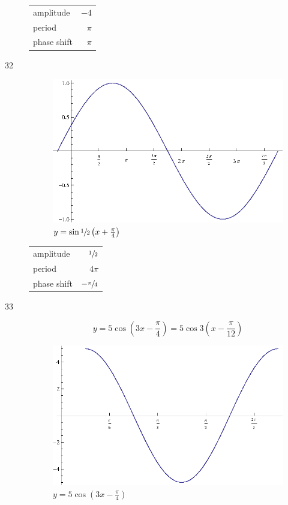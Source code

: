 \documentclass{exam}
\begin{document}
\begin{description}
        \begin{tabular}[H]{lr}
          \toprule
          amplitude   & $-4$ \\
          period      & $\pi$ \\
          phase shift & $\pi$ \\
          \bottomrule
        \end{tabular}

      \item[32]
        \begin{figure}[H]
          \centering
          \includegraphics[scale=0.8]{exercise32.eps}
          \caption{$y = \sin \sfrac{1}{2} \left( x + \frac{\pi}{4} \right)$}
        \end{figure}

        \begin{tabular}[H]{lr}
          \toprule
          amplitude   & $\sfrac{1}{2}$ \\
          period      & $4 \pi$ \\
          phase shift & $- \sfrac{\pi}{4}$ \\
          \bottomrule
        \end{tabular}

      \item[33]
        \[
          y = 5 \cos \left( 3x - \frac{\pi}{4} \right) = 5 \cos 3 \left( x - \frac{\pi}{12} \right)
        \]

        \begin{figure}[H]
          \centering
          \includegraphics[scale=0.8]{exercise33.eps}
          \caption{$y = 5 \cos \left( 3x - \frac{\pi}{4} \right)$}
        \end{figure}


\end{description}
\end{document}

